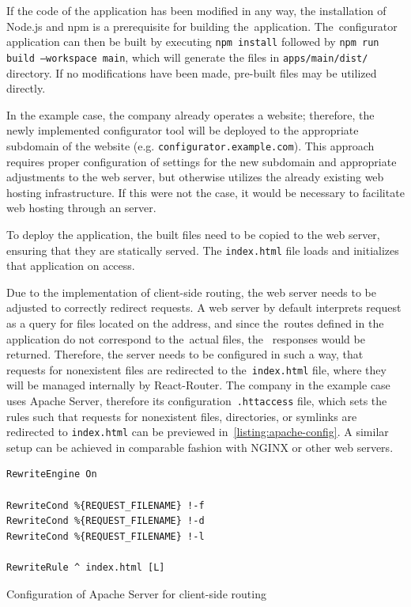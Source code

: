 If the code of the application has been modified in any way, the installation of Node.js and npm is a prerequisite for building the~application. The~configurator application can then be built by executing \texttt{npm install} followed by \texttt{npm run build --workspace main}, which will generate the files in \texttt{apps/main/dist/} directory. If no modifications have been made, pre-built files may be utilized directly.

In the example case, the company already operates a website; therefore, the newly implemented configurator tool will be deployed to the appropriate subdomain of the website (e.g. \texttt{configurator.example.com}). This approach requires proper configuration of  settings for the new subdomain and appropriate adjustments to the web server, but otherwise utilizes the already existing web hosting infrastructure. If this were not the case, it would be necessary to facilitate web hosting through an  server.

To deploy the application, the built files need to be copied to the web server, ensuring that they are statically served. The \texttt{index.html} file loads and initializes that application on access.

Due to the implementation of client-side routing, the web server needs to be adjusted to correctly redirect requests. A web server by default interprets request as a query for files located on the  address, and since the~routes defined in the application do not correspond to the~actual files, the~ responses would be returned. Therefore, the server needs to be configured in such a way, that requests for nonexistent files are redirected to the~\texttt{index.html} file, where they will be managed internally by React-Router. The company in the example case uses Apache  Server, therefore its configuration~\texttt{.httaccess} file, which sets the rules such that requests for nonexistent files, directories, or symlinks are redirected to \texttt{index.html} can be previewed in~\autoref{listing:apache-config}. A similar setup can be achieved in comparable fashion with NGINX or other web servers.

\begin{listing}[h]
\begin{verbatim}
RewriteEngine On
 
RewriteCond %{REQUEST_FILENAME} !-f
RewriteCond %{REQUEST_FILENAME} !-d
RewriteCond %{REQUEST_FILENAME} !-l
 
RewriteRule ^ index.html [L]
\end{verbatim}
\caption{Configuration of Apache  Server for client-side routing}
\label{listing:apache-config}
\end{listing}

